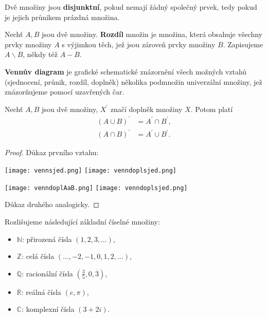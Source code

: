 \begin{definition}
  Dvě množiny jsou \textbf{disjunktní}, pokud nemají žádný společný prvek, tedy pokud je jejich průnikem prázdná množina.
\end{definition}

\begin{definition}
  Nechť $A, B$ jsou dvě množiny. \textbf{Rozdíl} množin je množina, která obsahuje všechny prvky množiny $A$ s výjimkou těch, jež jsou zároveň prvky množiny $B$. Zapisujeme $A \smallsetminus B$, někdy též $A-B$.
\end{definition}

\begin{definition}
  \textbf{Vennův diagram} je grafické schematické znázornění všech možných vztahů (sjednocení, průnik, rozdíl, doplněk) několika podmnožin univerzální množiny, jež znázorňujeme pomocí uzavřených čar.
\end{definition}

\begin{veta}
  Nechť $A, B$ jsou dvě množiny, $X^\prime$ značí doplněk množiny $X$. Potom platí
  \begin{align*}
  (A \cup B)^\prime &= A^\prime \cap B^\prime, \\
  (A \cap B)^\prime &= A^\prime \cup B^\prime.
  \end{align*}
\end{veta}

\begin{proof}
  Důkaz prvního vztahu:

  \begin{minipage}{0.48\textwidth}
    \centering
        \texttt{[image: vennsjed.png]}
        \texttt{[image: venndoplsjed.png]}
  \end{minipage}
  \hfill
  \noindent\begin{minipage}{0.48\textwidth}
  \centering
        \texttt{[image: venndoplAaB.png]}
        \texttt{[image: venndoplsjed.png]}
  \end{minipage}

  Důkaz druhého analogicky.
\end{proof}

\begin{pozn}
  Rozlišujeme následující základní číselné množiny:
  \begin{itemize}
    \item $\mathbb{N}$: přirozená čísla $(1, 2, 3, \dots)$,
    \item $\mathbb{Z}$: celá čísla $(\dots, -2, -1, 0, 1, 2, \dots)$,
    \item $\mathbb{Q}$: racionální čísla $(\frac{3}{5}, 0,\overline{3})$,
    \item $\mathbb{R}$: reálná čísla $(e, \pi)$,
    \item $\mathbb{C}$: komplexní čísla $(3+2i)$.
  \end{itemize}
\end{pozn}


